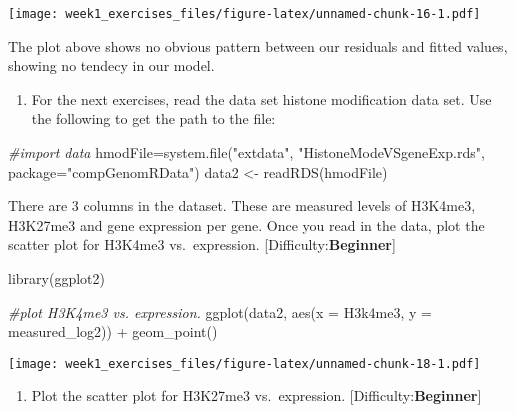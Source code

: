 \documentclass[
]{article}
\newenvironment{Shaded}{\begin{snugshade}}{\end{snugshade}}
\newcommand{\AttributeTok}[1]{\textcolor[rgb]{0.77,0.63,0.00}{#1}}
\newcommand{\CommentTok}[1]{\textcolor[rgb]{0.56,0.35,0.01}{\textit{#1}}}
\newcommand{\FunctionTok}[1]{\textcolor[rgb]{0.00,0.00,0.00}{#1}}
\newcommand{\NormalTok}[1]{#1}
\newcommand{\OtherTok}[1]{\textcolor[rgb]{0.56,0.35,0.01}{#1}}
\newcommand{\SpecialCharTok}[1]{\textcolor[rgb]{0.00,0.00,0.00}{#1}}
\newcommand{\StringTok}[1]{\textcolor[rgb]{0.31,0.60,0.02}{#1}}
\providecommand{\tightlist}{%
  \setlength{\itemsep}{0pt}\setlength{\parskip}{0pt}}
\begin{document}
\texttt{[image: week1\_exercises\_files/figure-latex/unnamed-chunk-16-1.pdf]}

The plot above shows no obvious pattern between our residuals and fitted
values, showing no tendecy in our model.

\begin{enumerate}
\def\labelenumi{\arabic{enumi}.}
\setcounter{enumi}{5}
\tightlist
\item
  For the next exercises, read the data set histone modification data
  set. Use the following to get the path to the file:
\end{enumerate}

\begin{Shaded}
\begin{Highlighting}[]
\CommentTok{\#import data}
\NormalTok{hmodFile}\OtherTok{=}\FunctionTok{system.file}\NormalTok{(}\StringTok{"extdata"}\NormalTok{,}
                    \StringTok{"HistoneModeVSgeneExp.rds"}\NormalTok{,}
                     \AttributeTok{package=}\StringTok{"compGenomRData"}\NormalTok{)}
\NormalTok{data2 }\OtherTok{\textless{}{-}} \FunctionTok{readRDS}\NormalTok{(hmodFile)}
\end{Highlighting}
\end{Shaded}

There are 3 columns in the dataset. These are measured levels of
H3K4me3, H3K27me3 and gene expression per gene. Once you read in the
data, plot the scatter plot for H3K4me3 vs.~expression.
{[}Difficulty:\textbf{Beginner}{]}

\begin{Shaded}
\begin{Highlighting}[]
\FunctionTok{library}\NormalTok{(ggplot2)}

\CommentTok{\#plot H3K4me3 vs. expression.}
\FunctionTok{ggplot}\NormalTok{(data2, }\FunctionTok{aes}\NormalTok{(}\AttributeTok{x =}\NormalTok{ H3k4me3, }\AttributeTok{y =}\NormalTok{ measured\_log2)) }\SpecialCharTok{+} 
  \FunctionTok{geom\_point}\NormalTok{()}
\end{Highlighting}
\end{Shaded}

\texttt{[image: week1\_exercises\_files/figure-latex/unnamed-chunk-18-1.pdf]}

\begin{enumerate}
\def\labelenumi{\arabic{enumi}.}
\setcounter{enumi}{6}
\tightlist
\item
  Plot the scatter plot for H3K27me3 vs.~expression.
  {[}Difficulty:\textbf{Beginner}{]}
\end{enumerate}
\end{document}
